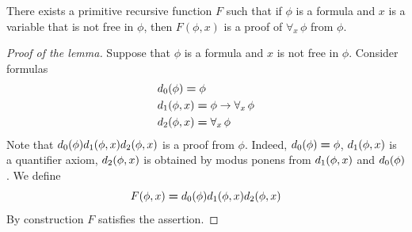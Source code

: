 \documentclass[10pt]{amsart}
\newcommand{\meq}{\boldsymbol{=}}
\begin{document}
\begin{lemma}\label{lemma:gamma_case_of_variable_generalization}
  There exists a primitive recursive function $F$ such that if $\phi$ is a formula and $x$ is a variable that is not free in $\phi$, then $F(\phi,x)$ is a proof of $\forall_x\,\phi$ from $\phi$. 
\end{lemma}
\begin{proof}[Proof of the lemma]
Suppose that $\phi$ is a formula and $x$ is not free in $\phi$. Consider formulas
  \begin{align*}
    &d_{\rm{0}}(\phi) \meq \phi\\
    &d_{\rm{1}}(\phi,x) \meq \phi \ra \forall_x\,\phi\\
    &d_{\rm{2}}(\phi,x) \meq \forall_x\,\phi\\
  \end{align*}
  Note that $d_{\rm{0}}(\phi)d_{\rm{1}}(\phi,x)d_{\rm{2}}(\phi,x)$ is a proof from $\phi$. Indeed, $d_{\rm{0}}(\phi) \meq \phi$, $d_{\rm{1}}(\phi,x)$ is a quantifier axiom, $d_{\rm{2}}(\phi,x)$ is obtained by modus ponens from $d_{\rm{1}}(\phi,x)$ and $d_{\rm{0}}(\phi)$. We define
  $$F(\phi,x) \meq d_{\rm{0}}(\phi)d_{\rm{1}}(\phi,x)d_{\rm{2}}(\phi,x)$$
  By construction $F$ satisfies the assertion.
\end{proof}
\end{document}
